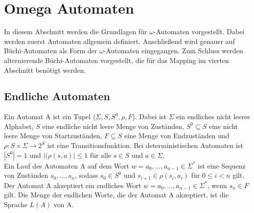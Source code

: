\section{Omega Automaten}

In diesem Abschnitt werden die Grundlagen für $\omega$-Automaten vorgestellt. Dabei werden zuerst Automaten allgemein definiert. Anschließend wird genauer auf Büchi-Automaten als Form der $\omega$-Automaten eingegangen. Zum Schluss werden alternierende Büchi-Automaten vorgestellt, die für das Mapping im vierten Abschnitt benötigt werden. 

\subsection{Endliche Automaten}
Ein Automat A ist ein Tupel ($\Sigma, S, S^0, \rho, F$). Dabei ist $\Sigma$ ein endliches nicht leeres Alphabet, $S$ eine endliche nicht leere Menge von Zuständen, $S^0\subseteq S$ eine nicht leere Menge von Startzuständen, $F\subseteq S$ eine Menge von Endzuständen und $\rho : S \times \Sigma \rightarrow 2^S$ ist eine Transitionsfunktion. Bei deterministischen Automaten ist $|S^0|=1$ und $|(\rho(s,a)|\leq 1$ für alle $s\in S$ und $a \in \Sigma$.\\
Ein Lauf des Automaten A auf dem Wort $w=a_0,...,a_{n-1}\in \Sigma^\ast$ ist eine Sequenz von Zuständen $s_0,...,s_n$, sodass $s_0 \in S^0$ und $s_{i+1} \in \rho(s_i, a_i)$ für $0\leq i<n$ gilt. Der Automat A akzeptiert ein endliches Wort $w=a_0,...,a_{n-1}\in\Sigma^\ast$, wenn $s_n\in F$ gilt. Die Menge der endlichen Worte, die der Automat A akzeptiert, ist die Sprache $L(A)$ von A.

